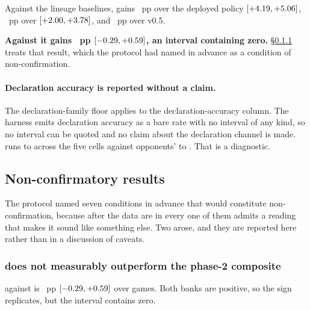 \begin{table}[!ht]\centering
\caption{Strength against the \vsix{} frontier and lineage baselines, paired duplicate blocks, both
holdout banks.}
\label{tab:frontier}
{\tabfont}
\end{table}

Against the lineage baselines, \sestina{} gains \vsevenBtwoIncumbent{}~pp over the deployed
\vsix{} policy $[+4.19, +5.06]$, \vsevenBtwoFmid{}~pp over \fmid{}
$[+2.00, +3.78]$, and \vsevenBtwoVfive{}~pp over v0.5.

\textbf{Against \composite{} it gains \vsevenBtwoComposite{}~pp
$[-0.29, +0.59]$, an interval containing zero.}
\S\ref{sec:results-composite} treats that result, which the protocol had named in advance as a
condition of non-confirmation.

\paragraph{Declaration accuracy is reported without a claim.} The declaration-family floor applies to
the declaration-accuracy column. The harness emits declaration accuracy as a bare rate with no
interval of any kind, so no interval can be quoted and no claim about the declaration channel is
made. \sestina{} runs \vsevenDeclFrozenLo{} to \vsevenDeclFrozenHi{} across the five cells against
opponents' \vsevenDeclOppLo{} to \vsevenDeclOppHi{}. That is a diagnostic.

\subsection{Non-confirmatory results}
\label{sec:results-nonconfirm}

The protocol named seven conditions in advance that would constitute non-confirmation, because after
the data are in every one of them admits a reading that makes it sound like something else. Two arose,
and they are reported here rather than in a discussion of caveats.

\subsubsection{\sestina{} does not measurably outperform the phase-2 composite}
\label{sec:results-composite}

\sestina{} against \composite{} is \vsevenBtwoComposite{}~pp
$[-0.29, +0.59]$ over \vsevenBtwoCompositeN{} games. Both banks are
positive, so the sign replicates, but the interval contains zero.

